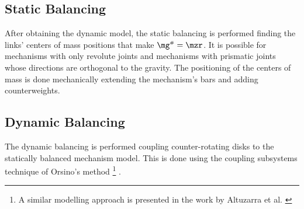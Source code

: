 \documentclass[a4paper,11pt,brazil,fleqn]{article}
\begin{document}
\subsection{Static Balancing}\label{S02-2}

After obtaining the dynamic model, the static balancing is performed finding the links' centers of mass positions that make $\mg\ssh = \mzr$. It is possible for mechanisms with only revolute joints and mechanisms with prismatic joints whose directions are orthogonal to the gravity. The positioning of the centers of mass is done mechanically extending the mechanism's bars and adding counterweights.

\subsection{Dynamic Balancing}\label{S02-3}

The dynamic balancing is performed coupling counter-rotating disks to the statically balanced mechanism model. This is done using the coupling subsystems technique of Orsino's method \footnote{A similar modelling approach is presented in the work by Altuzarra et al. \cite{22altuzarra}} \cite{21orsino}.
\end{document}
